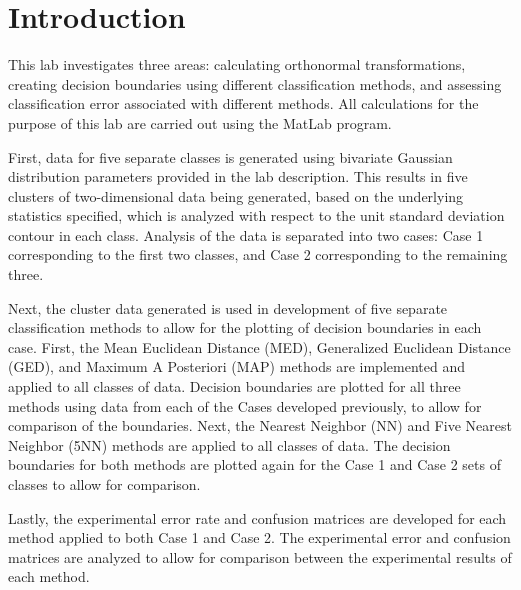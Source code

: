 \section{Introduction}
This lab investigates three areas: calculating orthonormal transformations, creating decision boundaries using different classification methods, and assessing classification error associated with different methods. All calculations for the purpose of this lab are carried out using the MatLab program.

First, data for five separate classes is generated using bivariate Gaussian distribution parameters provided in the lab description. This results in five clusters of two-dimensional data being generated, based on the underlying statistics specified, which is analyzed with respect to the unit standard deviation contour in each class. Analysis of the data is separated into two cases: Case 1 corresponding to the first two classes, and Case 2 corresponding to the remaining three.

Next, the cluster data generated is used in development of five separate classification methods to allow for the plotting of decision boundaries in each case. First, the Mean Euclidean Distance (MED), Generalized Euclidean Distance (GED), and Maximum A Posteriori (MAP) methods are implemented and applied to all classes of data. Decision boundaries are plotted for all three methods using data from each of the Cases developed previously, to allow for comparison of the boundaries. Next, the Nearest Neighbor (NN) and Five Nearest Neighbor (5NN) methods are applied to all classes of data. The decision boundaries for both methods are plotted again for the Case 1 and Case 2 sets of classes to allow for comparison.

Lastly, the experimental error rate and confusion matrices are developed for each method applied to both Case 1 and Case 2. The experimental error and confusion matrices are analyzed to allow for comparison between the experimental results of each method.
